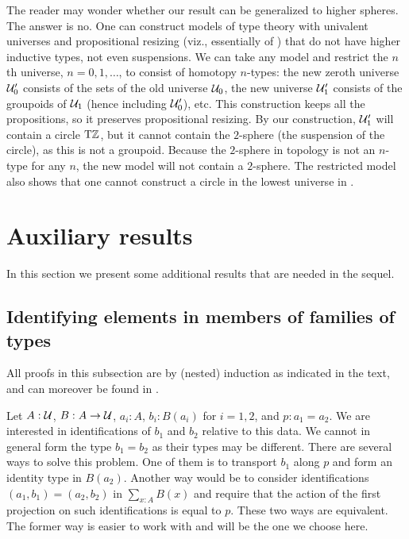 \documentclass[a4paper,12pt]{amsart}
\begin{document}
The reader may wonder whether our result can be generalized to higher spheres.
The answer is no.
One can construct models of type theory with univalent universes and propositional resizing
(viz., essentially of \UniMath{})
that do not have higher inductive types, not even suspensions.
We can take any model and restrict the $n$th universe, $n=0,1,\dots$,
to consist of homotopy $n$-types:
the new zeroth universe $\mathcal{U}'_0$ consists of the sets of the old universe $\mathcal{U}_0$,
the new universe $\mathcal{U}'_1$ consists of the groupoids of $\mathcal{U}_1$ (hence including $\mathcal{U}'_0$),
etc.
This construction keeps all the propositions, so it preserves propositional resizing.
By our construction, $\mathcal{U}'_1$ will contain a circle ${\mathrm{T}\mathbb{Z}}$,
but it cannot contain the $2$-sphere (the suspension of the circle),
as this is not a groupoid.
Because the $2$-sphere in topology is not an $n$-type for any $n$,
the new model will not contain a $2$-sphere.
The restricted model also shows that one cannot construct a circle in
the lowest universe in \UniMath{}.

\section{Auxiliary results}\label{sec:auxiliaries}

In this section we present some additional results that are needed in the sequel.

\subsection{Identifying elements in members of families of types}
\label{sec:pathovers}


All proofs in this subsection are by (nested) induction as indicated in the text,
and can moreover be found in \cite{paths-over-formalized}.

Let $A : \mathcal{U}$, $B : A \to \mathcal{U}$, $a_i:A$, $b_i:B(a_i)$ for $i=1,2$, and $p : a_1 = a_2$.
We are interested in identifications of $b_1$ and $b_2$ relative to this data.
We cannot in general form the type $b_1 = b_2$ as their types may be different.
There are several ways to solve this problem. One of them is to transport $b_1$ along
$p$ and form an identity type in $B(a_2)$. Another way would be to consider
identifications $(a_1,b_1) = (a_2,b_2)$ in $\sum_{x:A} B(x)$ and require that the
action of the first projection on such identifications is equal to $p$.
These two ways are equivalent.
The former way is easier to work with and will be the one we choose here.
\end{document}
